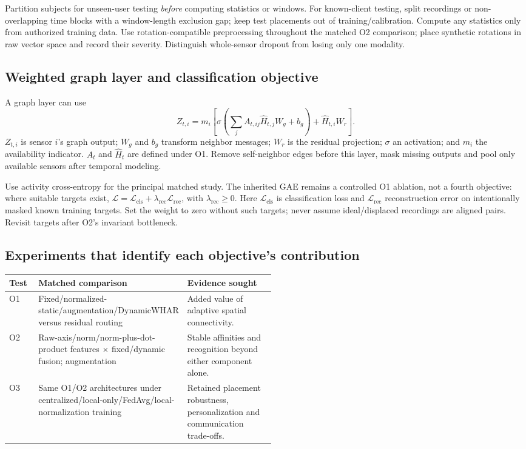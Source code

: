 \documentclass[10pt]{article}
\begin{document}
Partition subjects for unseen-user testing \emph{before} computing statistics or windows. For known-client testing, split recordings or non-overlapping time blocks with a window-length exclusion gap; keep test placements out of training/calibration. Compute any statistics only from authorized training data. Use rotation-compatible preprocessing throughout the matched O2 comparison; place synthetic rotations in raw vector space and record their severity. Distinguish whole-sensor dropout from losing only one modality.

\subsection*{Weighted graph layer and classification objective}
A graph layer can use
\[
Z_{t,i}=m_i\left[\sigma\!\left(\sum_j A_{t,ij}\widehat H_{t,j}W_g+b_g\right)
+\widehat H_{t,i}W_r\right].
\]
$Z_{t,i}$ is sensor $i$'s graph output; $W_g$ and $b_g$ transform neighbor messages; $W_r$ is the residual projection; $\sigma$ an activation; and $m_i$ the availability indicator. $A_t$ and $\widehat H_t$ are defined under O1. Remove self-neighbor edges before this layer, mask missing outputs and pool only available sensors after temporal modeling.

Use activity cross-entropy for the principal matched study. The inherited GAE remains a controlled O1 ablation, not a fourth objective: where suitable targets exist, $\mathcal L=\mathcal L_{\mathrm{cls}}+\lambda_{\mathrm{rec}}\mathcal L_{\mathrm{rec}}$, with $\lambda_{\mathrm{rec}}\geq0$. Here $\mathcal L_{\mathrm{cls}}$ is classification loss and $\mathcal L_{\mathrm{rec}}$ reconstruction error on intentionally masked known training targets. Set the weight to zero without such targets; never assume ideal/displaced recordings are aligned pairs. Revisit targets after O2's invariant bottleneck.

\subsection*{Experiments that identify each objective's contribution}
\begingroup
\small
\renewcommand{\arraystretch}{1.18}
\begin{tabularx}{\linewidth}{@{}>{\raggedright\arraybackslash}p{0.11\linewidth}>{\raggedright\arraybackslash}p{0.40\linewidth}X@{}}
\toprule
\textbf{Test} & \textbf{Matched comparison} & \textbf{Evidence sought}\\
\midrule
O1 & Fixed/normalized-static/augmentation/DynamicWHAR versus residual routing & Added value of adaptive spatial connectivity.\\
O2 & Raw-axis/norm/norm-plus-dot-product features $\times$ fixed/dynamic fusion; augmentation & Stable affinities and recognition beyond either component alone.\\
O3 & Same O1/O2 architectures under centralized/local-only/FedAvg/local-normalization training & Retained placement robustness, personalization and communication trade-offs.\\
\bottomrule
\end{tabularx}
\endgroup
\end{document}
